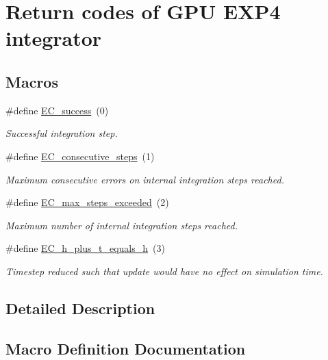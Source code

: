 \hypertarget{group__exprb43cu__ErrCodes}{}\section{Return codes of G\+PU E\+X\+P4 integrator}
\label{group__exprb43cu__ErrCodes}
\subsection*{Macros}
\begin{DoxyCompactItemize}
\item 
\#define \hyperlink{group__exprb43cu__ErrCodes_gabd83bc0f9f475a2189a4db4a08b790ca}{E\+C\+\_\+success}~(0)
\begin{DoxyCompactList}\small\item\em Successful integration step. \end{DoxyCompactList}\item 
\#define \hyperlink{group__exprb43cu__ErrCodes_gae0287841c08f86f5709660fd731615ad}{E\+C\+\_\+consecutive\+\_\+steps}~(1)
\begin{DoxyCompactList}\small\item\em Maximum consecutive errors on internal integration steps reached. \end{DoxyCompactList}\item 
\#define \hyperlink{group__exprb43cu__ErrCodes_ga0f0275d9851ab5c19b79a963d5084df3}{E\+C\+\_\+max\+\_\+steps\+\_\+exceeded}~(2)
\begin{DoxyCompactList}\small\item\em Maximum number of internal integration steps reached. \end{DoxyCompactList}\item 
\#define \hyperlink{group__exprb43cu__ErrCodes_ga9326efd544880e2683c4453365ca2704}{E\+C\+\_\+h\+\_\+plus\+\_\+t\+\_\+equals\+\_\+h}~(3)
\begin{DoxyCompactList}\small\item\em Timestep reduced such that update would have no effect on simulation time. \end{DoxyCompactList}\end{DoxyCompactItemize}


\subsection{Detailed Description}


\subsection{Macro Definition Documentation}
